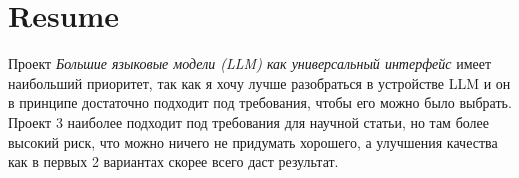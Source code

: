\documentclass[12pt]{article}
\begin{document}
\section{Resume}
Проект \emph{Большие языковые модели (LLM) как универсальный интерфейс} имеет наибольший приоритет, так как я хочу лучше разобраться в устройстве LLM и он в принципе достаточно подходит под требования, чтобы его можно было выбрать. Проект 3 наиболее подходит под требования для научной статьи, но там более высокий риск, что можно ничего не придумать хорошего, а улучшения качества как в первых 2 вариантах скорее всего даст результат. 
\end{document}
